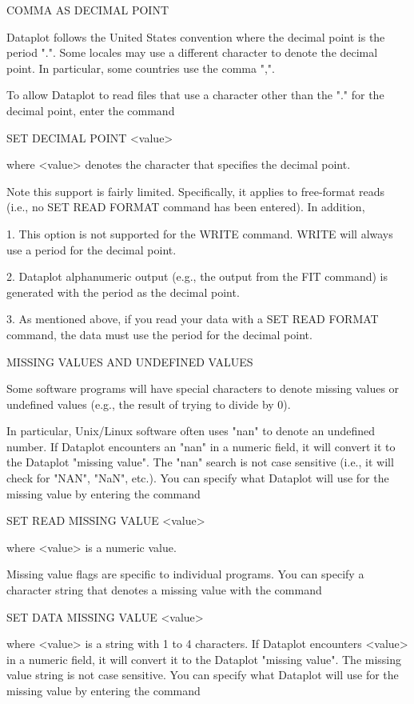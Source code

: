 COMMA AS DECIMAL POINT

Dataplot follows the United States convention where the decimal
point is the period ".".  Some locales may use a different
character to denote the decimal point.  In particular, some
countries use the comma ",".

To allow Dataplot to read files that use a character other than
the "." for the decimal point, enter the command

     SET DECIMAL POINT <value>

where <value> denotes the character that specifies the decimal
point.

Note this support is fairly limited.  Specifically, it applies
to free-format reads (i.e., no SET READ FORMAT command has been
entered).  In addition,

   1. This option is not supported for the WRITE command.  WRITE
      will always use a period for the decimal point.

   2. Dataplot alphanumeric output (e.g., the output from the FIT
      command) is generated with the period as the decimal point.

   3. As mentioned above, if you read your data with a 
      SET READ FORMAT command, the data must use the period
      for the decimal point.


MISSING VALUES AND UNDEFINED VALUES

Some software programs will have special characters to denote
missing values or undefined values (e.g., the result of trying
to divide by 0).

In particular, Unix/Linux software often uses "nan" to denote an
undefined number.  If Dataplot encounters an "nan" in a numeric
field, it will convert it to the Dataplot "missing value".  The "nan"
search is not case sensitive (i.e., it will check for "NAN", "NaN",
etc.).  You can specify what Dataplot will use for the missing value
by entering the command

    SET READ MISSING VALUE  <value>

where <value> is a numeric value.

Missing value flags are specific to individual programs.  You can
specify a character string that denotes a missing value with the
command

    SET DATA MISSING VALUE <value>

where <value> is a string with 1 to 4 characters.  If Dataplot
encounters <value> in a numeric field, it will convert it to the
Dataplot "missing value".  The missing value string is not case
sensitive.  You can specify what Dataplot will use for the missing
value by entering the command

